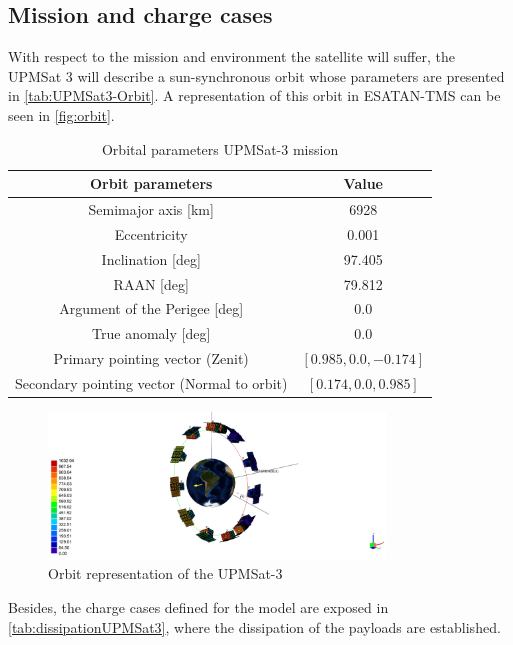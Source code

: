 \subsection{Mission and charge cases}
With respect to the mission and environment the satellite will suffer, the UPMSat 3 will describe a sun-synchronous orbit whose parameters are presented in \autoref{tab:UPMSat3-Orbit}. A representation of this orbit in ESATAN-TMS can be seen in  \autoref{fig:orbit}.
\begin{table}[H]
    \centering
    \caption{Orbital parameters UPMSat-3 mission}
    \label{tab:UPMSat3-Orbit}
    \begin{tabular}{c c}
    \toprule
    \multicolumn{1}{c}{\textbf{Orbit parameters}} & \multicolumn{1}{c}{\textbf{Value}} \\ \midrule
    Semimajor axis [km] & 6928 \\
    Eccentricity & 0.001 \\
    Inclination [deg] & 97.405 \\
    RAAN [deg] & 79.812 \\
    Argument of the Perigee [deg] & 0.0 \\
    True anomaly [deg] & 0.0 \\
    Primary pointing vector (Zenit) & {$[0.985,0.0,-0.174]$} \\
    Secondary pointing vector (Normal to orbit) & {$[0.174,0.0,0.985]$} \\
    \bottomrule
    \end{tabular}
    \end{table}
\begin{figure}[H]
    \centering
    \includegraphics[width = 0.8\textwidth]{Figures/UPMSat3/orbit.jpg}
    \caption{Orbit representation of the UPMSat-3}
    \label{fig:orbit}
\end{figure}
Besides, the charge cases defined for the model are exposed in \autoref{tab:dissipationUPMSat3}, where the dissipation of the payloads are established. 
